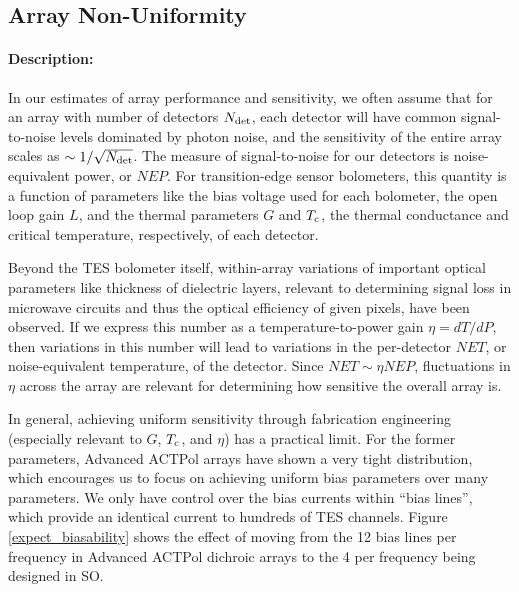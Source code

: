 \subsection{Array Non-Uniformity}

\paragraph{Description:}
In our estimates of array performance and sensitivity, we often assume that for an array with number of detectors $N_{\mbox{\scriptsize det}}$, each detector will have common signal-to-noise levels dominated by photon noise, and the sensitivity of the entire array scales as $\sim 1 / \sqrt{N_{\mbox{\scriptsize det}}}$. The measure of signal-to-noise for our detectors is noise-equivalent power, or $NEP$. For transition-edge sensor bolometers, this quantity is a function of parameters like the bias voltage used for each bolometer, the open loop gain $L$, and the thermal parameters $G$ and $T_{\mbox{\scriptsize c}}$, the thermal conductance and critical temperature, respectively, of each detector.

Beyond the TES bolometer itself, within-array variations of important optical parameters like thickness of dielectric layers, relevant to determining signal loss in microwave circuits and thus the optical efficiency of given pixels, have been observed. If we express this number as a temperature-to-power gain $\eta = dT/dP$, then variations in this number will lead to variations in the per-detector $NET$, or noise-equivalent temperature, of the detector. Since $NET \sim \eta NEP$, fluctuations in $\eta$ across the array are relevant for determining how sensitive the overall array is.

In general, achieving uniform sensitivity through fabrication engineering (especially relevant to $G$, $T_{\mbox{\scriptsize c}}$, and $\eta$) has a practical limit. For the former parameters, Advanced ACTPol arrays have shown a very tight distribution, which encourages us to focus on achieving uniform bias parameters over many parameters. We only have control over the bias currents within ``bias lines'', which provide an identical current to hundreds of TES channels. Figure \ref{expect_biasability} shows the effect of moving from the 12 bias lines per frequency in Advanced ACTPol dichroic arrays to the 4 per frequency being designed in SO.

